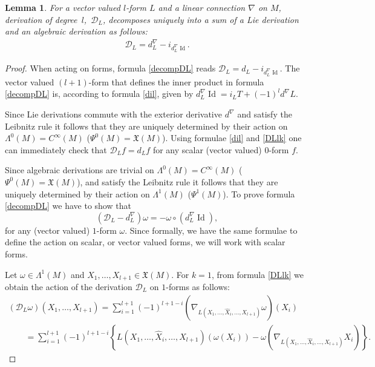\documentclass[pdftex]{sigma}
\numberwithin{equation}{section}
\newtheorem{Lemma}[Theorem]{Lemma}
\begin{document}
\begin{Lemma} \label{lem:dec_DL} For a vector valued $l$-form $L$ and a linear connection $\nabla$ on $M$,
derivation of degree~$l$,~${\mathcal D}_L$, decomposes uniquely
into a sum of a Lie derivation and an algebraic derivation
as follows:
\begin{gather}
{\mathcal D}_L= d^{\nabla}_L -
i_{d^{\nabla}_L\operatorname{Id}}.\label{decompDL}
\end{gather}
\end{Lemma}
\begin{proof}
When acting on forms, formula \eqref{decompDL} reads ${\mathcal
D}_L= d_L - i_{d^{\nabla}_L\operatorname{Id}}$. The vector valued
$(l+1)$-form that def\/ines the inner product in formula
\eqref{decompDL} is, according to formula \eqref{dil}, given by
$d^{\nabla}_L\operatorname{Id}=i_LT +(-1)^ld^{\nabla}L.$

Since Lie derivations commute with the exterior
derivative $d^{\nabla}$ and satisfy the Leibnitz rule it follows that
they are uniquely determined by their action on
$\Lambda^0(M)=C^{\infty}(M)$ ($\Psi^0(M)={\mathfrak X}(M)$).
Using formulae \eqref{dil} and \eqref{DLlk} one can immediately
check that ${\mathcal D}_Lf=d_Lf$ for any scalar (vector
valued) $0$-form $f$.

Since algebraic derivations are trivial on
$\Lambda^0(M)=C^{\infty}(M)$ ($\Psi^0(M)={\mathfrak X}(M)$), and
satisfy the Leibnitz rule it follows that they are uniquely determined by
their action on $\Lambda^1(M)$ ($\Psi^1(M)$). To prove formula
\eqref{decompDL} we have to show that
\[
\left({\mathcal D}_L- d^{\nabla}_L\right)\omega = -\omega \circ
\left(d^{\nabla}_L\operatorname{Id}\right),
\]
 for any (vector valued) $1$-form
$\omega$. Since formally, we have the same formulae to def\/ine the
action on scalar, or vector valued forms, we will work with scalar
forms.

Let $\omega \in \Lambda^1(M)$ and $X_1, \dots , X_{l+1} \in
{\mathfrak X}(M)$. For $k=1$, from formula \eqref{DLlk} we obtain
the action of the derivation ${\mathcal D}_L$ on $1$-forms as
follows:
\begin{gather}
 \left({\mathcal D}_L\omega\right)(X_1,\dots , X_{l+1})=
\sum_{i=1}^{l+1}(-1)^{l+1-i}\left(\nabla_{L(X_1,\dots ,
\hat{X}_i,\dots ,X_{l+1})}\omega\right)(X_i) \nonumber  \\
\qquad{}
=  \sum_{i=1}^{l+1}(-1)^{l+1-i} \left\{L(X_1,\dots , \hat{X}_i,\dots ,X_{l+1})
(\omega(X_i)) -\omega\left( \nabla_{L(X_1,\dots ,
\hat{X}_i,\dots ,X_{l+1})} X_i\right)\right\}. \!\!\!\label{eq:dlo1}
\end{gather}


\end{proof}
\end{document}
